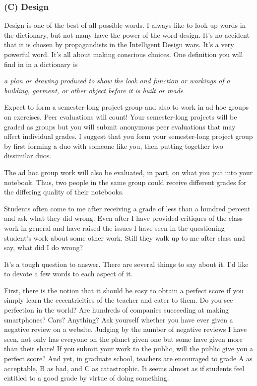 \hypertarget{c-design}{%
\subsubsection{(C) Design}\label{c-design}}

Design is one of the best of all possible words. I always like to look
up words in the dictionary, but not many have the power of the word
design. It's no accident that it is chosen by propagandists in the
Intelligent Design wars. It's a very powerful word. It's all about
making conscious choices. One definition you will find in in a
dictionary is

\emph{a plan or drawing produced to show the look and function or
workings of a building, garment, or other object before it is built or
made}

\hypertarget{groups}{%
\label{groups}}

Expect to form a semester-long project group and also to work in ad hoc
groups on exercises. Peer evaluations will count! Your semester-long
projects will be graded as groups but you will submit anonymous peer
evaluations that may affect individual grades. I suggest that you form
your semester-long project group by first forming a duo with someone
like you, then putting together two dissimilar duos.

The ad hoc group work will also be evaluated, in part, on what you put
into your notebook. Thus, two people in the same group could receive
different grades for the differing quality of their notebooks.

\hypertarget{grading}{%
\label{grading}}

Students often come to me after receiving a grade of less than a hundred
percent and ask what they did wrong. Even after I have provided
critiques of the class work in general and have raised the issues I have
seen in the questioning student's work about some other work. Still they
walk up to me after class and say, what did I do wrong?

It's a tough question to answer. There are several things to say about
it. I'd like to devote a few words to each aspect of it.

First, there is the notion that it should be easy to obtain a perfect
score if you simply learn the eccentricities of the teacher and cater to
them. Do you see perfection in the world? Are hundreds of companies
succeeding at making smartphones? Cars? Anything? Ask yourself whether
you have ever given a negative review on a website. Judging by the
number of negative reviews I have seen, not only has everyone on the
planet given one but some have given more than their share! If you
submit your work to the public, will the public give you a perfect
score? And yet, in graduate school, teachers are encouraged to grade A
as acceptable, B as bad, and C as catastrophic. It seems almost as if
students feel entitled to a good grade by virtue of doing something.

